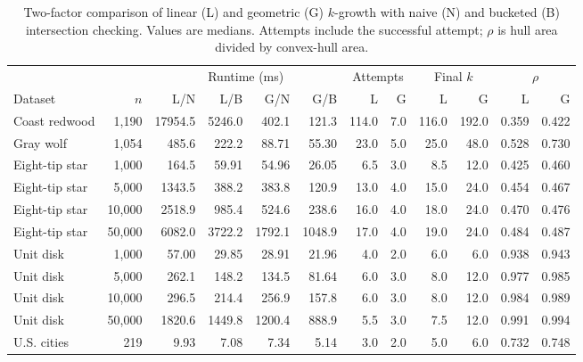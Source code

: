 \begin{table}[t]
\centering
\caption{Two-factor comparison of linear (L) and geometric (G) $k$-growth with naive (N) and bucketed (B) intersection checking. Values are medians. Attempts include the successful attempt; $\rho$ is hull area divided by convex-hull area.}
\label{tab:growth-factorial}
\small
\begin{tabular}{lrrrrrrrrrrr}
\toprule
& & \multicolumn{4}{c}{Runtime (ms)} & \multicolumn{2}{c}{Attempts} & \multicolumn{2}{c}{Final $k$} & \multicolumn{2}{c}{$\rho$} \\
\cmidrule(lr){3-6}\cmidrule(lr){7-8}\cmidrule(lr){9-10}\cmidrule(lr){11-12}
Dataset & $n$ & L/N & L/B & G/N & G/B & L & G & L & G & L & G \\
\midrule
Coast redwood & 1,190 & 17954.5 & 5246.0 & 402.1 & 121.3 & 114.0 & 7.0 & 116.0 & 192.0 & 0.359 & 0.422 \\
Gray wolf & 1,054 & 485.6 & 222.2 & 88.71 & 55.30 & 23.0 & 5.0 & 25.0 & 48.0 & 0.528 & 0.730 \\
Eight-tip star & 1,000 & 164.5 & 59.91 & 54.96 & 26.05 & 6.5 & 3.0 & 8.5 & 12.0 & 0.425 & 0.460 \\
Eight-tip star & 5,000 & 1343.5 & 388.2 & 383.8 & 120.9 & 13.0 & 4.0 & 15.0 & 24.0 & 0.454 & 0.467 \\
Eight-tip star & 10,000 & 2518.9 & 985.4 & 524.6 & 238.6 & 16.0 & 4.0 & 18.0 & 24.0 & 0.470 & 0.476 \\
Eight-tip star & 50,000 & 6082.0 & 3722.2 & 1792.1 & 1048.9 & 17.0 & 4.0 & 19.0 & 24.0 & 0.484 & 0.487 \\
Unit disk & 1,000 & 57.00 & 29.85 & 28.91 & 21.96 & 4.0 & 2.0 & 6.0 & 6.0 & 0.938 & 0.943 \\
Unit disk & 5,000 & 262.1 & 148.2 & 134.5 & 81.64 & 6.0 & 3.0 & 8.0 & 12.0 & 0.977 & 0.985 \\
Unit disk & 10,000 & 296.5 & 214.4 & 256.9 & 157.8 & 6.0 & 3.0 & 8.0 & 12.0 & 0.984 & 0.989 \\
Unit disk & 50,000 & 1820.6 & 1449.8 & 1200.4 & 888.9 & 5.5 & 3.0 & 7.5 & 12.0 & 0.991 & 0.994 \\
U.S. cities & 219 & 9.93 & 7.08 & 7.34 & 5.14 & 3.0 & 2.0 & 5.0 & 6.0 & 0.732 & 0.748 \\
\bottomrule
\end{tabular}
\end{table}
